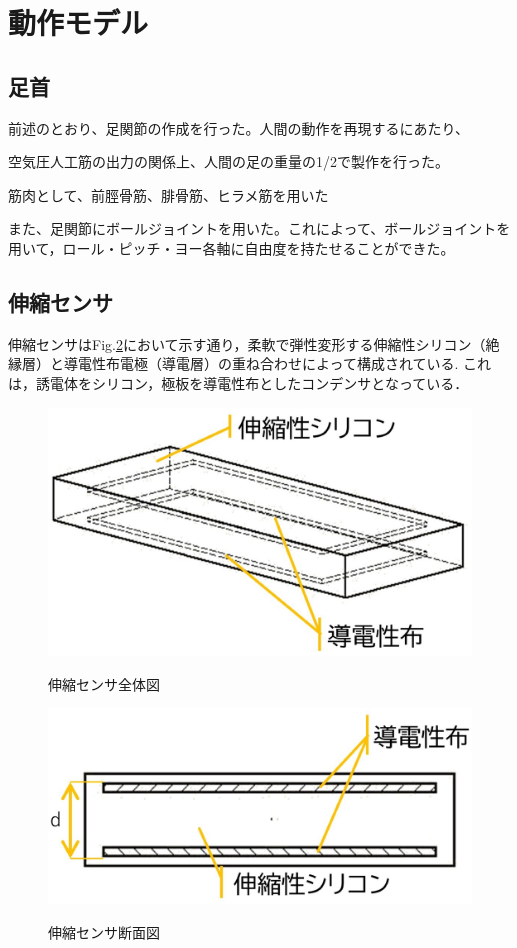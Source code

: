 \section{動作モデル}
\subsection{足首}
前述のとおり、足関節の作成を行った。人間の動作を再現するにあたり、

空気圧人工筋の出力の関係上、人間の足の重量の1/2で製作を行った。

筋肉として、前脛骨筋、腓骨筋、ヒラメ筋を用いた

また、足関節にボールジョイントを用いた。これによって、ボールジョイントを用いて，ロール・ピッチ・ヨー各軸に自由度を持たせることができた。

\subsection{伸縮センサ}
伸縮センサはFig.\ref{伸縮センサ断面図}において示す通り，柔軟で弾性変形する伸縮性シリコン（絶縁層）と導電性布電極（導電層）の重ね合わせによって構成されている.
これは，誘電体をシリコン，極板を導電性布としたコンデンサとなっている．

\begin{figure}[h]
    \begin{center}
        \label{伸縮センサ全体図}
        \includegraphics[width=0.5\columnwidth,clip]{Photo/2.実験方法/スライド1.eps}
        \caption{伸縮センサ全体図}
    \end{center}
\end{figure}
\begin{figure}[h]
    \begin{center}       
        \label{伸縮センサ断面図}
        \includegraphics[width=0.5\columnwidth,clip]{Photo/2.実験方法/スライド2.eps}
        \caption{伸縮センサ断面図}
    \end{center}
\end{figure}

